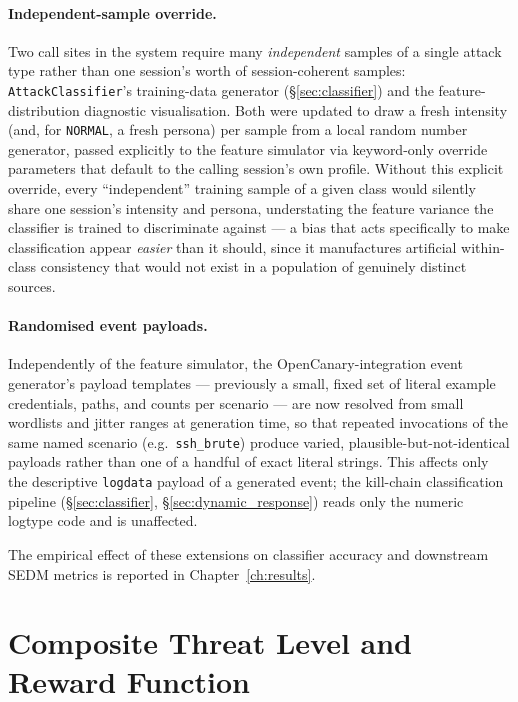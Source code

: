 \paragraph{Independent-sample override.}
Two call sites in the system require many \emph{independent} samples of a
single attack type rather than one session's worth of session-coherent
samples: \texttt{AttackClassifier}'s training-data generator
(\S\ref{sec:classifier}) and the feature-distribution diagnostic
visualisation. Both were updated to draw a fresh intensity (and, for
\texttt{NORMAL}, a fresh persona) per sample from a local random number
generator, passed explicitly to the feature simulator via keyword-only
override parameters that default to the calling session's own profile.
Without this explicit override, every ``independent'' training sample of a
given class would silently share one session's intensity and persona,
understating the feature variance the classifier is trained to discriminate
against — a bias that acts specifically to make classification appear
\emph{easier} than it should, since it manufactures artificial within-class
consistency that would not exist in a population of genuinely distinct
sources.

\paragraph{Randomised event payloads.}
Independently of the feature simulator, the OpenCanary-integration event
generator's payload templates — previously a small, fixed set of literal
example credentials, paths, and counts per scenario — are now resolved from
small wordlists and jitter ranges at generation time, so that repeated
invocations of the same named scenario (e.g.\ \texttt{ssh\_brute}) produce
varied, plausible-but-not-identical payloads rather than one of a handful of
exact literal strings. This affects only the descriptive \texttt{logdata}
payload of a generated event; the kill-chain classification pipeline
(\S\ref{sec:classifier}, \S\ref{sec:dynamic_response}) reads only the
numeric logtype code and is unaffected.

The empirical effect of these extensions on classifier accuracy and
downstream SEDM metrics is reported in Chapter~\ref{ch:results}.

\section{Composite Threat Level and Reward Function}
\label{sec:threat}

